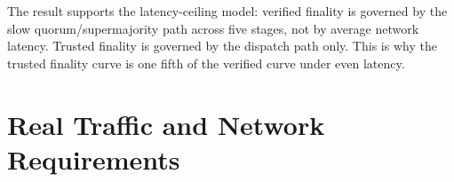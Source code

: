\documentclass[11pt]{article}
\begin{document}
\begin{table}[h]
\centering
\caption{Random-latency repeated runs, 1--300 ms per edge.}
\end{table}

The result supports the latency-ceiling model: verified finality is governed by
the slow quorum/supermajority path across five stages, not by average network
latency. Trusted finality is governed by the dispatch path only. This is why the
trusted finality curve is one fifth of the verified curve under even latency.

\section{Real Traffic and Network Requirements}
\end{document}
